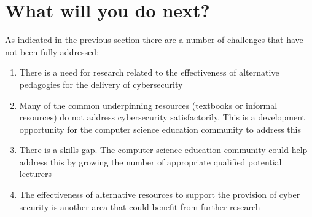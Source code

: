 \documentclass[sigconf]{acmart}
\begin{document}
\begin{comment}

The ACM/IEEE-CS Joint Task Force on Computing Curricula~\cite[p.~97]{ACM2013a} takes a distinct view on the Knowledge Areas (KAs):

\begin{quote}
	``{\emph{The Information Assurance and Security KA is unique among the set of KAs presented here
			given the manner in which the topics are pervasive throughout other KAs.}}''
\end{quote}

It proposes nine ``core'' hours and 63.5 distributed across the other KAs. Nevertheless, the situation on the ground in the USA is different~\cite{Ackerman2019a}:

\begin{quote}
	``{\emph{Universities suffer shortcomings, as well. Roughly 85 of them offer undergraduate and/or graduate degrees in cybersecurity. There is a big catch, however. Far more diversified computer science programs, which attract substantially more students, don't mandate even one cybersecurity course.}}''
\end{quote}

\end{comment}



\section {What will you do next?}	
As indicated in the previous section there are a number of challenges that have not been fully addressed:
\begin{enumerate}
	\item There is a need for research related to the effectiveness of alternative pedagogies for the delivery of cybersecurity
	\item Many of the common underpinning resources (textbooks or informal resources) do not address cybersecurity satisfactorily. This is a development opportunity for the computer science education community to address this
	\item There is a skills gap. The computer science education community could help address this by growing the number of appropriate qualified potential lecturers
	\item The effectiveness of alternative resources to support the provision of cyber security is another area that could benefit from further research
\end{enumerate}
\end{document}
